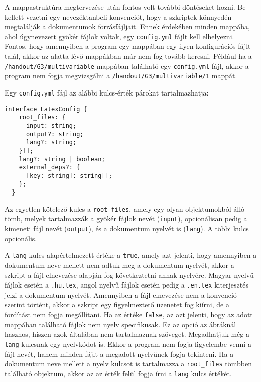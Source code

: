 A mappastruktúra megtervezése után fontos volt további döntéseket hozni.
Be kellett vezetni egy nevezéktanbeli konvenciót, hogy a szkriptek könnyedén
megtalálják a dokumentumok forrásfájljait. Ennek érdekében minden mappába,
ahol úgynevezett gyökér fájlok voltak, egy \texttt{config.yml} fájlt kell
elhelyezni. Fontos, hogy amennyiben a program egy mappában egy ilyen
konfigurációs fájlt talál, akkor az alatta lévő mappákban már nem fog
tovább keresni. Például ha a \texttt{/handout/G3/multivariable} mappában
található egy \texttt{config.yml} fájl, akkor a program nem fogja
megvizsgálni a \texttt{/handout/G3/multivariable/1} mappát.

Egy \texttt{config.yml} fájl az alábbi kulcs-érték párokat tartalmazhatja:

\begin{lstlisting}[caption={A konfigurációs fájlok sémájának interfésze \textit{TypeScript} nyelvben}]
  interface LatexConfig {
    root_files: {
      input: string;
      output?: string;
      lang?: string;
    }[];
    lang?: string | boolean;
    external_deps?: {
      [key: string]: string[];
    };
  }
\end{lstlisting}

Az egyetlen kötelező kulcs a \texttt{root\_files}, amely egy olyan objektumokból
álló tömb, melyek tartalmazzák a gyökér fájlok nevét (\texttt{input}),
opcionálisan pedig a kimeneti fájl nevét (\texttt{output}), és a dokumentum
nyelvét is (\texttt{lang}). A többi kulcs opcionális.

A \texttt{lang} kulcs alapértelmezett értéke a \texttt{true}, amely azt jelenti,
hogy amennyiben a dokumentum neve mellett nem adtuk meg a dokumentum nyelvét,
akkor a szkript a fájl elnevezése alapján fog következtetni annak nyelvére.
Magyar nyelvű fájlok esetén a \texttt{.hu.tex}, angol nyelvű fájlok esetén
pedig a \texttt{.en.tex} kiterjesztés jelzi a dokumentum nyelvét. Amennyiben
a fájl elnevezése nem a konvenció szerint történt, akkor a szkript egy
figyelmeztető üzenetet fog kiírni, de a fordítást nem fogja megállítani.
Ha az értéke \texttt{false}, az azt jelenti, hogy az adott mappában található
fájlok nem nyelv specifikusak. Ez az opció az ábráknál hasznos, hiszen azok
általában nem tartalmaznak szöveget. Megadhatjuk még a \texttt{lang} kulcsnak
egy nyelvkódot is. Ekkor a program nem fogja figyelembe venni a fájl nevét,
hanem minden fájlt a megadott nyelvűnek fogja tekinteni. Ha a dokumentum neve
mellett a nyelv kulcsot is tartalmazza a \texttt{root\_files} tömbben
található objektum, akkor az az érték felül fogja írni a \texttt{lang} kulcs
értékét.

